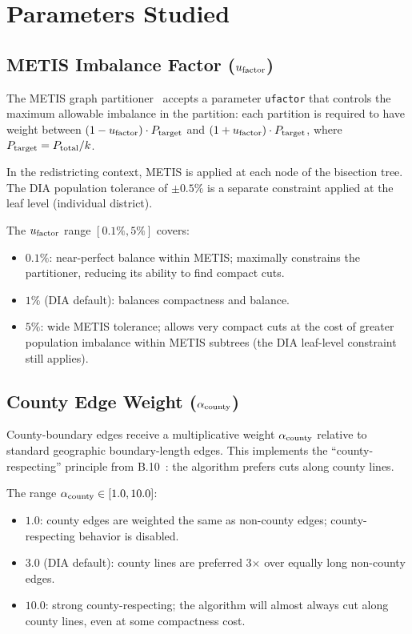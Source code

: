 \section{Parameters Studied}
\label{sec:parameters}

\subsection{METIS Imbalance Factor ($u_{\mathrm{factor}}$)}

The METIS graph partitioner~\citep{karypis2013manual} accepts a parameter
\texttt{ufactor} that controls the maximum allowable imbalance in the
partition: each partition is required to have weight between
$(1 - u_{\mathrm{factor}}) \cdot P_{\rm target}$ and $(1 + u_{\mathrm{factor}}) \cdot P_{\rm target}$,
where $P_{\rm target} = P_{\rm total} / k$.

In the redistricting context, METIS is applied at each node of the
\ar{} bisection tree.
The DIA population tolerance of $\pm 0.5\%$ is a separate constraint
applied at the leaf level (individual district).

The $u_{\mathrm{factor}}$ range $[0.1\%, 5\%]$ covers:
\begin{itemize}
\item $0.1\%$: near-perfect balance within METIS; maximally constrains
      the partitioner, reducing its ability to find compact cuts.
\item $1\%$ (DIA default): balances compactness and balance.
\item $5\%$: wide METIS tolerance; allows very compact cuts at the cost
      of greater population imbalance within METIS subtrees (the DIA
      leaf-level constraint still applies).
\end{itemize}

\subsection{County Edge Weight ($\alpha_{\mathrm{county}}$)}

County-boundary edges receive a multiplicative weight $\alpha_{\mathrm{county}}$ relative
to standard geographic boundary-length edges.
This implements the ``county-respecting'' principle from B.10~\citep{b10paper}:
the algorithm prefers cuts along county lines.

The range $\alpha_{\mathrm{county}} \in [1.0, 10.0]$:
\begin{itemize}
\item $1.0$: county edges are weighted the same as non-county edges;
      county-respecting behavior is disabled.
\item $3.0$ (DIA default): county lines are preferred 3$\times$ over
      equally long non-county edges.
\item $10.0$: strong county-respecting; the algorithm will almost always
      cut along county lines, even at some compactness cost.
\end{itemize}

